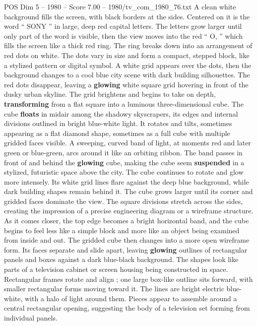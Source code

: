 \begin{textsample}{POS Dim 5 – 1980 – Score 7.00 – 1980/tv\_com\_1980\_76.txt}  \label{ex:f5_pos_036}
A clean white background fills the screen, with black borders at the sides.
Centered on it is the word “ SONY ” in large, deep red capital letters.
The letters grow larger until only part of the word is visible, then the view moves into the red “ O, ” which fills the screen like a thick red ring.
The ring breaks down into an arrangement of red dots on white.
The dots vary in size and form a compact, stepped block, like a stylized pattern or digital symbol.
A white grid appears over the dots, then the background changes to a cool blue city scene with dark building silhouettes.
The red dots disappear, leaving a \textbf{glowing} white square grid hovering in front of the dusky urban skyline.
The grid brightens and begins to take on depth, \textbf{transforming} from a flat square into a luminous three-dimensional cube.
The cube \textbf{floats} in midair among the shadowy skyscrapers, its edges and internal divisions outlined in bright blue-white light.
It rotates and tilts, sometimes appearing as a flat diamond shape, sometimes as a full cube with multiple gridded faces visible.
A sweeping, curved band of light, at moments red and later green or blue-green, arcs around it like an orbiting ribbon.
The band passes in front of and behind the \textbf{glowing} cube, making the cube seem \textbf{suspended} in a stylized, futuristic space above the city.
The cube continues to rotate and glow more intensely.
Its white grid lines flare against the deep blue background, while dark building shapes remain behind it.
The cube grows larger until its corner and gridded faces dominate the view.
The square divisions stretch across the sides, creating the impression of a precise engineering diagram or a wireframe structure.
As it comes closer, the top edge becomes a bright horizontal band, and the cube begins to feel less like a simple block and more like an object being examined from inside and out.
The gridded cube then changes into a more open wireframe form.
Its faces separate and slide apart, leaving \textbf{glowing} outlines of rectangular panels and boxes against a dark blue-black background.
The shapes look like parts of a television cabinet or screen housing being constructed in space.
Rectangular frames rotate and align ; one large box-like outline sits forward, with smaller rectangular forms moving toward it.
The lines are bright electric blue-white, with a halo of light around them.
Pieces appear to assemble around a central rectangular opening, suggesting the body of a television set forming from individual panels.

\end{textsample}
